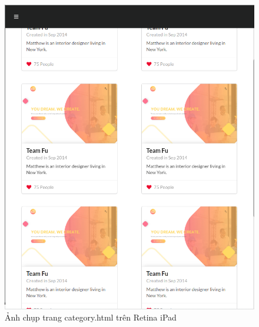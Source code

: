 \documentclass[a4paper]{article}
\begin{document}
\begin{figure}[H]
\begin{center}
\includegraphics[page=1, scale=0.215]{screenshot/retina3.png}
\caption{Ảnh chụp trang category.html trên Retina iPad}
\end{center}
\end{figure}
\end{document}
